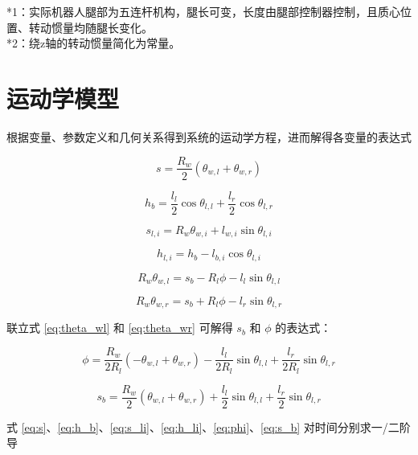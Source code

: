 \documentclass[
  oneside,
  degree=bachelor,
  fullwidthstop=false,
  fontset=fandol,
  times=false,
  minted=true,
  biblatex=true,
]{tongjithesis}
\begin{document}
*1：实际机器人腿部为五连杆机构，腿长可变，长度由腿部控制器控制，且质心位置、转动惯量均随腿长变化。\\
*2：绕z轴的转动惯量简化为常量。

\section{运动学模型}

根据变量、参数定义和几何关系得到系统的运动学方程，进而解得各变量的表达式

\begin{equation}
s = \frac{R_w}{2}(\theta_{w,l} + \theta_{w,r}) 
\label{eq:s}
\end{equation}

\begin{equation}
h_b = \frac{l_l}{2}\cos\theta_{l,l} + \frac{l_r}{2}\cos\theta_{l,r} 
\label{eq:h_b}
\end{equation}

\begin{equation}
s_{l,i} = R_w\theta_{w,i} + l_{w,i}\sin\theta_{l,i}
\label{eq:s_li}
\end{equation}

\begin{equation}
h_{l,i} = h_b - l_{b,i}\cos\theta_{l,i} 
\label{eq:h_li}
\end{equation}

\begin{equation}
R_w\theta_{w,l} = s_b - R_l\phi - l_l\sin\theta_{l,l} 
\label{eq:theta_wl}
\end{equation}

\begin{equation}
R_w\theta_{w,r} = s_b + R_l\phi - l_r\sin\theta_{l,r}
\label{eq:theta_wr}
\end{equation}

联立式 \ref{eq:theta_wl} 和 \ref{eq:theta_wr} 可解得 $s_b$ 和 $\phi$ 的表达式：

\begin{equation}
\phi = \frac{R_w}{2R_l}(-\theta_{w,l} + \theta_{w,r}) - \frac{l_l}{2R_l}\sin\theta_{l,l} + \frac{l_r}{2R_l}\sin\theta_{l,r} 
\label{eq:phi}
\end{equation}

\begin{equation}
s_b = \frac{R_w}{2}(\theta_{w,l} + \theta_{w,r}) + \frac{l_l}{2}\sin\theta_{l,l} + \frac{l_r}{2}\sin\theta_{l,r} 
\label{eq:s_b}
\end{equation}

式 \ref{eq:s}、\ref{eq:h_b}、\ref{eq:s_li}、\ref{eq:h_li}、\ref{eq:phi}、\ref{eq:s_b} 对时间分别求一/二阶导
\end{document}
